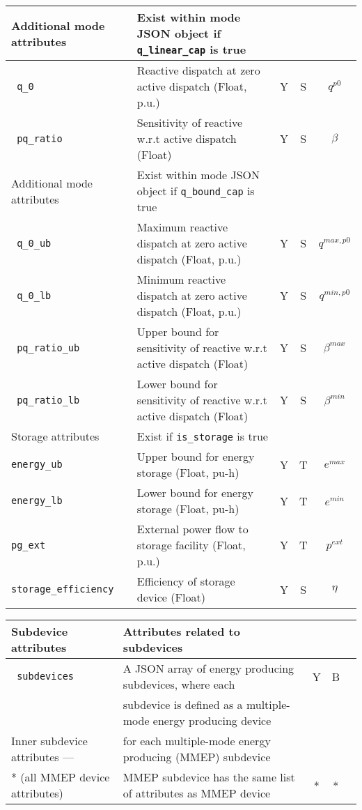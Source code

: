 \documentclass{article}
\begin{document}
\begin{center}
\small
\begin{tabular}{ l | l | c | c | c |}
 \hline
   Additional mode attributes & Exist within mode JSON object if {\tt q\_linear\_cap} is true &  &  & \\
  \hline
  {\tt\color{red} q\_0}               & Reactive dispatch at zero active dispatch (Float, p.u.) & Y & S & $q^{p0}$\\
  {\tt\color{red} pq\_ratio}          & Sensitivity of reactive w.r.t active dispatch (Float) & Y & S & $\beta$\\
  \hline \hline
  Additional mode attributes & Exist within mode JSON object if {\tt q\_bound\_cap} is true &  &  & \\
  \hline
  {\tt\color{red} q\_0\_ub}           & Maximum reactive dispatch at zero active dispatch (Float, p.u.) & Y & S & $q^{max,p0}$\\
  {\tt\color{red} q\_0\_lb}           & Minimum reactive dispatch at zero active dispatch (Float, p.u.) & Y & S & $q^{min,p0}$\\
  {\tt\color{red} pq\_ratio\_ub}      & Upper bound for sensitivity of reactive w.r.t active dispatch (Float) & Y & S & $\beta^{max}$\\
  {\tt\color{red} pq\_ratio\_lb}      & Lower bound for sensitivity of reactive w.r.t active dispatch (Float) & Y & S & $\beta^{min}$\\
  \hline 
  \hline
  Storage attributes & Exist if {\tt is\_storage} is true &  &  & \\
  \hline
  {\tt energy\_ub} & Upper bound for energy storage (Float, pu-h)& Y & T & $e^{max}$\\
  {\tt energy\_lb} & Lower bound for energy storage (Float, pu-h)& Y & T & $e^{min}$\\ 
  {\tt pg\_ext} & External power flow to storage facility (Float, p.u.)& Y & T & $p^{ext}$\\ 
  {\tt storage\_efficiency} & Efficiency of storage device (Float) & Y & S & $\eta$\\
  \hline
\end{tabular}
\end{center}

\begin{center}
\small
\begin{tabular}{ l | l | c | c | c |}
  Subdevice attributes & Attributes related to subdevices  &  &  & \\
  \hline
  {\tt\color{red} subdevices} & A JSON array of energy producing subdevices, where each& Y & B & \\
                              & subdevice is defined as a multiple-mode energy producing device &  &  & \\
                              \hline \hline
  Inner subdevice attributes --- & for each multiple-mode energy producing (MMEP) subdevice &  &  & \\
  \hline
  * (all MMEP device attributes) & MMEP subdevice has the same list of attributes as MMEP device  & * & * & \\
  \hline
\end{tabular}
\end{center}
\end{document}
